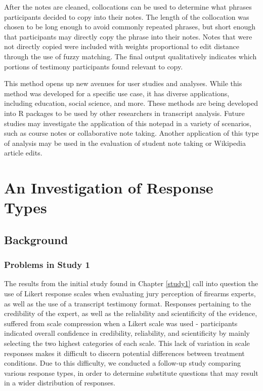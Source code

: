 \documentclass[print]{nuthesis}
\begin{document}
After the notes are cleaned, collocations can be used to determine what phrases participants decided to copy into their notes.
The length of the collocation was chosen to be long enough to avoid commonly repeated phrases, but short enough that participants may directly copy the phrase into their notes.
Notes that were not directly copied were included with weights proportional to edit distance through the use of fuzzy matching.
The final output qualitatively indicates which portions of testimony participants found relevant to copy.

This method opens up new avenues for user studies and analyses.
While this method was developed for a specific use case, it has diverse applications, including education, social science, and more.
These methods are being developed into R packages to be used by other
researchers in transcript analysis.
Future studies may investigate the application of this notepad in a variety of scenarios, such as course notes or collaborative note
taking.
Another application of this type of analysis may be used in the evaluation of student note taking or Wikipedia article edits.

\hypertarget{study2}{%
\chapter{An Investigation of Response Types}\label{study2}}

\hypertarget{background-1}{%
\section{Background}\label{background-1}}

\hypertarget{problems-in-study-1}{%
\subsection{Problems in Study 1}\label{problems-in-study-1}}

The results from the initial study found in Chapter \ref{study1} call into question the use of Likert response scales when evaluating jury perception of firearms experts, as well as the use of a transcript testimony format.
Responses pertaining to the credibility of the expert, as well as the reliability and scientificity of the evidence, suffered from scale compression when a Likert scale was used - participants indicated overall confidence in credibility, reliability, and scientificity by mainly selecting the two highest categories of each scale.
This lack of variation in scale responses makes it difficult to discern potential differences between treatment conditions.
Due to this difficulty, we conducted a follow-up study comparing various response types, in order to determine substitute questions that may result in a wider distribution of responses.
\end{document}
